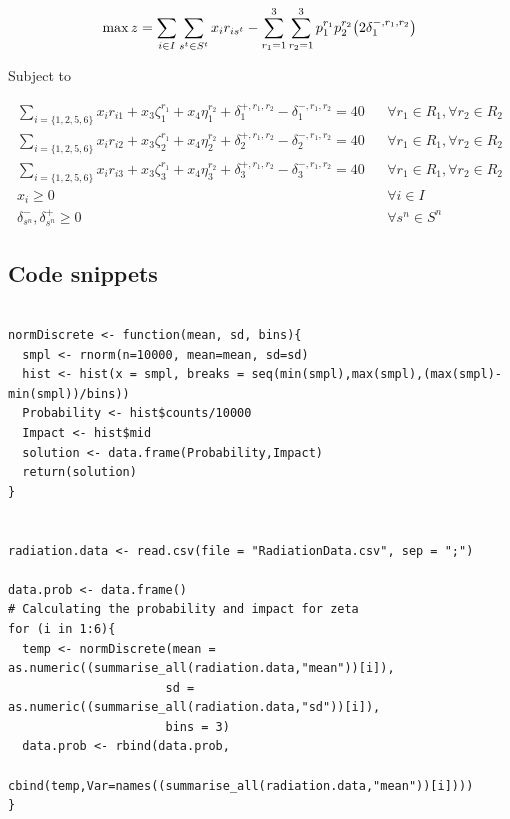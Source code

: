 \documentclass[a4paper,11pt]{article}
\begin{document}
\begin{equation}
	\max z = \sum_{i\in I}\sum_{s^t \in S^t} x_ir_{is^t} -\sum_{r_1=1}^3\sum_{r_2=1}^3p_1^{r_1}p_2^{r_2}\big{(}2\delta_1^{-,r_1,r_2}\big{)}
\end{equation}

Subject to

\begin{align}
	\sum_{i =\{1,2,5,6\}}x_ir_{i1} +x_{3}\zeta_1^{r_1}+ x_{4}\eta_1^{r_2}+\delta_1^{+,r_1,r_2}-\delta_1^{-,r_1,r_2}= 40 && \forall r_1 \in R_1, \forall r_2 \in R_2\\
	\sum_{i =\{1,2,5,6\}}x_ir_{i2} +x_{3}\zeta_2^{r_1}+ x_{4}\eta_2^{r_2}+\delta_2^{+,r_1,r_2}-\delta_2^{-,r_1,r_2}= 40 && \forall r_1 \in R_1, \forall r_2 \in R_2\\
	\sum_{i =\{1,2,5,6\}}x_ir_{i3} +x_{3}\zeta_3^{r_1}+ x_{4}\eta_3^{r_2}+\delta_3^{+,r_1,r_2}-\delta_3^{-,r_1,r_2}= 40 && \forall r_1 \in R_1, \forall r_2 \in R_2\\
	 x_i \geq 0 && \forall i \in I \\
	 \delta_{s^n}^-,\delta_{s^n}^+ \geq 0 && \forall s^n \in S^n
\end{align}


\subsection{Code snippets}

\begin{verbatim}
	
normDiscrete <- function(mean, sd, bins){
  smpl <- rnorm(n=10000, mean=mean, sd=sd)
  hist <- hist(x = smpl, breaks = seq(min(smpl),max(smpl),(max(smpl)-min(smpl))/bins))
  Probability <- hist$counts/10000
  Impact <- hist$mid
  solution <- data.frame(Probability,Impact)
  return(solution)
}


radiation.data <- read.csv(file = "RadiationData.csv", sep = ";")

data.prob <- data.frame()
# Calculating the probability and impact for zeta
for (i in 1:6){
  temp <- normDiscrete(mean = as.numeric((summarise_all(radiation.data,"mean"))[i]),
                      sd = as.numeric((summarise_all(radiation.data,"sd"))[i]), 
                      bins = 3)
  data.prob <- rbind(data.prob,
              cbind(temp,Var=names((summarise_all(radiation.data,"mean"))[i])))
}


\end{verbatim}

\newpage
\end{document}
